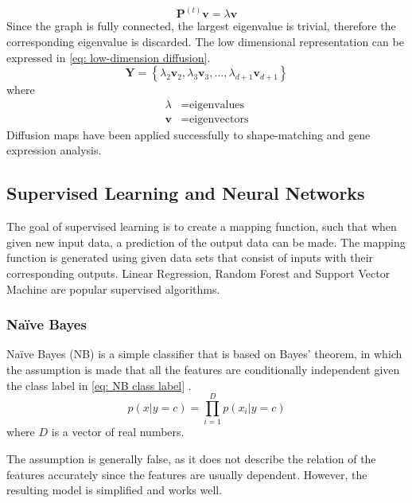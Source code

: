 \documentclass[11pt]{article}
\begin{document}
	\begin{equation}
		\textbf{P}^{(t)}\textbf{v} = \lambda\textbf{v}
		\label{eq: diffusion eigenproblem}
	\end{equation}
	Since the graph is fully connected, the largest eigenvalue is trivial, therefore the corresponding eigenvalue is discarded. The low dimensional representation can be expressed in \eqref{eq: low-dimension diffusion}.
	\begin{equation}
		\textbf{Y} = \left\{\lambda_2\textbf{v}_2, \lambda_3\textbf{v}_3,...,\lambda_{d+1}\textbf{v}_{d+1} \right\}
		\label{eq: low-dimension diffusion}
	\end{equation}
	where
	\vspace{-3mm}
	\begin{align*}
		\lambda &= \text{eigenvalues}\\
		\textbf{v} &= \text{eigenvectors}
	\end{align*}
	Diffusion maps have been applied successfully to shape-matching and gene expression analysis.
	
	\subsection{Supervised Learning and Neural Networks}
	The goal of supervised learning is to create a mapping function, such that when given new input data, a prediction of the output data can be made. The mapping function is generated using given data sets that consist of inputs with their corresponding outputs. Linear Regression, Random Forest and Support Vector Machine are popular supervised algorithms.
	
	\subsubsection{Na\"{i}ve Bayes}
	Na\"{i}ve Bayes (NB) is a simple classifier that is based on Bayes' theorem, in which the assumption is made that all the features are conditionally independent given the class label in \eqref{eq: NB class label} \cite{Murphy2006}. 
	\begin{equation}
		\label{eq: NB class label}
		p(x | y = c) = \prod_{i = 1}^{D}p(x_i | y = c)
	\end{equation}
	where $D$ is a vector of real numbers.
	
	The assumption is generally false, as it does not describe the relation of the features accurately since the features are usually dependent. However, the resulting model is simplified and works well.
	
\end{document}
